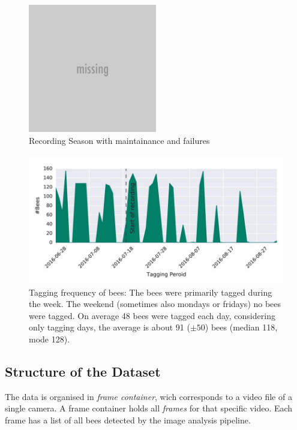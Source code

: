\begin{figure}[htb]
	\centering
	\includegraphics[width=0.5\textwidth]{Figures/foo}
	\caption{Recording Season with maintainance and failures}
	\label{fig:period}
\end{figure}

\begin{figure}[htb]
	\centering
	\includegraphics[width=1.0\textwidth]{Figures/tagging_period}
	\caption[Tagging Frequency]{Tagging frequency of bees: The bees were primarily tagged during the week. The weekend (sometimes also mondays or fridays) no bees were tagged. On average 48 bees were tagged each day, considering only tagging days, the average is about 91 ($\pm50$) bees (median 118, mode 128).}
	\label{fig:tagging}
\end{figure}

\subsection{Structure of the Dataset}
The data is organised in \emph{frame container}, wich corresponds to a video file of a single camera. A frame container holds all \emph{frames} for that specific video.
Each frame has a list of all bees detected by the image analysis pipeline.

